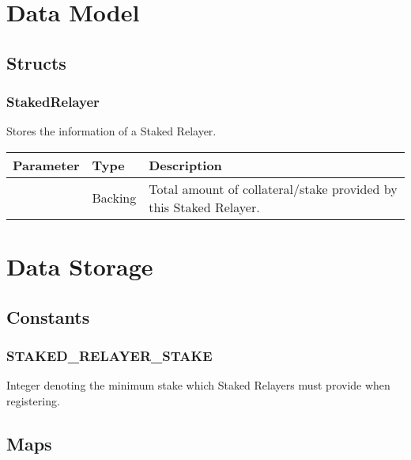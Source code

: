 \documentclass[a4paper,10pt,english]{sphinxmanual}
\begin{document}
\section{Data Model}
\label{\detokenize{spec/staked-relayers:data-model}}

\subsection{Structs}
\label{\detokenize{spec/staked-relayers:structs}}

\subsubsection{StakedRelayer}
\label{\detokenize{spec/staked-relayers:stakedrelayer}}
Stores the information of a Staked Relayer.


\begin{savenotes}\sphinxattablestart
\centering
\begin{tabulary}{\linewidth}[t]{|l|l|L|}
\hline
\sphinxstyletheadfamily 
Parameter
&\sphinxstyletheadfamily 
Type
&\sphinxstyletheadfamily 
Description
\\
\hline
{}
&
Backing
&
Total amount of collateral/stake provided by this Staked Relayer.
\\
\hline
\end{tabulary}
\par
\sphinxattableend\end{savenotes}


\section{Data Storage}
\label{\detokenize{spec/staked-relayers:data-storage}}

\subsection{Constants}
\label{\detokenize{spec/staked-relayers:constants}}

\subsubsection{STAKED\_RELAYER\_STAKE}
\label{\detokenize{spec/staked-relayers:staked-relayer-stake}}
Integer denoting the minimum stake which Staked Relayers must provide when registering.


\subsection{Maps}
\label{\detokenize{spec/staked-relayers:maps}}
\end{document}

